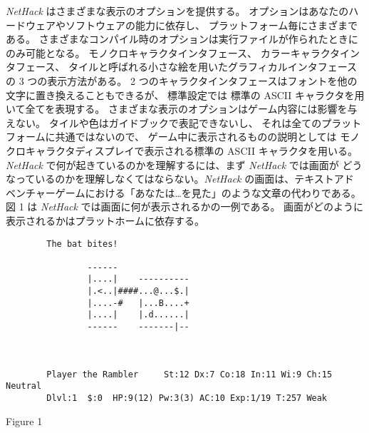 {\it NetHack\/} はさまざまな表示のオプションを提供する。
オプションはあなたのハードウェアやソフトウェアの能力に依存し、
プラットフォーム毎にさまざまである。
さまざまなコンパイル時のオプションは実行ファイルが作られたときにのみ可能となる。
モノクロキャラクタインタフェース、
カラーキャラクタインタフェース、
タイルと呼ばれる小さな絵を用いたグラフィカルインタフェースの 3 つの表示方法がある。
2 つのキャラクタインタフェースはフォントを他の文字に置き換えることもできるが、
標準設定では 標準の ASCII キャラクタを用いて全てを表現する。
さまざまな表示のオプションはゲーム内容には影響を与えない。
タイルや色はガイドブックで表記できないし、
それは全てのプラットフォームに共通ではないので、
ゲーム中に表示されるものの説明としては
モノクロキャラクタディスプレイで表示される標準の ASCII キャラクタを用いる。
{\it NetHack\/} で何が起きているのかを理解するには、まず {\it NetHack\/} では画面が
どうなっているのかを理解しなくてはならない。{\it NetHack\/} の画面は、テキストアド
ベンチャーゲームにおける「あなたは…を見た」のような文章の代わりである。
図 1 は {\it NetHack\/} では画面に何が表示されるかの一例である。
画面がどのように表示されるかはプラットホームに依存する。

\begin{verbatim}
        The bat bites!

                ------
                |....|    ----------
                |.<..|####...@...$.|
                |....-#   |...B....+
                |....|    |.d......|
                ------    -------|--



        Player the Rambler     St:12 Dx:7 Co:18 In:11 Wi:9 Ch:15  Neutral
        Dlvl:1  $:0  HP:9(12) Pw:3(3) AC:10 Exp:1/19 T:257 Weak
\end{verbatim}
\begin{center}
Figure 1
\end{center}

